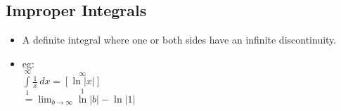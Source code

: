   \subsection{\color{BrickRed}Improper Integrals}
  \begin{multicols}{2}
  \begin{itemize}
    \item A definite integral where one or both sides have an
    infinite discontinuity.\\
  \columnbreak
    \item eg:\\
    $\int\limits_{1}^{\infty}\frac{1}{x}\,dx=\left[\ln\left| x
    \right|\right]\limits_{1}^{\infty}$\\
    $=\lim_{b\rightarrow\infty}\ln|b|-\ln|1|$\\
  \end{itemize}
  \end{multicols}
